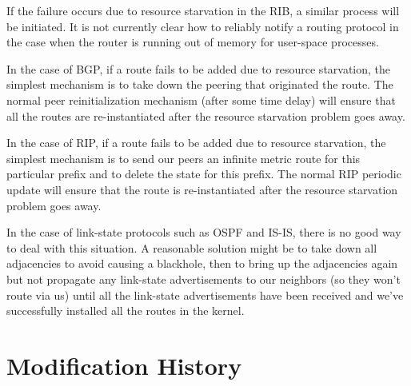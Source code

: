 \documentclass[11pt]{article}
\begin{document}
If the failure occurs due to resource starvation in the RIB, a similar
process will be initiated.  It is not currently clear how to reliably
notify a routing protocol in the case when the router is running out
of memory for user-space processes.

In the case of BGP, if a route fails to be added due to resource
starvation, the simplest mechanism is to take down the peering that
originated the route.  The normal peer reinitialization mechanism
(after some time delay) will ensure that all the routes are
re-instantiated after the resource starvation problem goes away.

In the case of RIP, if a route fails to be added due to resource
starvation, the simplest mechanism is to send our peers an infinite
metric route for this particular prefix and to delete the state for
this prefix.  The normal RIP periodic update will ensure that the
route is re-instantiated after the resource starvation problem goes
away.

In the case of link-state protocols such as OSPF and IS-IS, there is
no good way to deal with this situation.  A reasonable solution might
be to take down all adjacencies to avoid causing a blackhole, then to
bring up the adjacencies again but not propagate any link-state
advertisements to our neighbors (so they won't route via us) until all
the link-state advertisements have been received and we've
successfully installed all the routes in the kernel.

\appendix
\section{Modification History}
\end{document}
